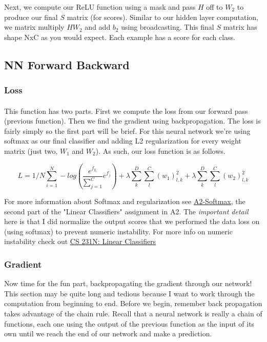 \documentclass[12pt]{article}
\begin{document}
Next, we compute our ReLU function using a mask and pass $H$ off to $W_2$ to produce 
our final $S$ matrix (for scores). Similar to our hidden layer computation, we matrix multiply
$HW_2$ and add $b_2$ using broadcasting. This final $S$ matrix has shape NxC as you would 
expect. Each example has a score for each class. 

\subsection{NN Forward Backward}
\subsubsection*{Loss}
\paragraph{}
This function has two parts. First we compute the loss from our forward pass (previous function). 
Then we find the gradient using backpropagation. The loss is fairly simply so the first
part will be brief. For this neural network we're using softmax as our final classifier and adding 
L2 regularization for every weight matrix (just two, $W_1$ and $W_2$). As such, our loss 
function is as follows. 

\begin{equation}
    L = 1/N \sum_{i=1}^N - log(\frac{e^{f_{y_i}}}{\sum_{j=1}^C} e^{f_j}) + 
    \lambda \sum_{k}^D \sum_{l}^C (w_1)_{l, k}^2 + 
    \lambda \sum_{k}^D \sum_{l}^C (w_2)_{l, k}^2
\end{equation}

\noindent For more information about Softmax and regularization see 
\href{https://github.com/bensmidt/EECS-498-DL-Computer-Vision/blob/main/A2/A2-Softmax.pdf}
{A2-Softmax}, the second part of the "Linear Classifiers" assignment in A2. The \emph{
important detail} here is that I did normalize the output scores that we performed the 
data loss on (using softmax) to prevent numeric instability. For more info on numeric instability
check out \href{https://cs231n.github.io/linear-classify/}{CS 231N: Linear Classifiers}

\subsubsection*{Gradient}

Now time for the fun part, backpropagating the gradient through our network! This section may 
be quite long and tedious because I want to work through the computation from beginning to end.
Before we begin, remember back propagation takes advantage of the chain rule. Recall that a neural 
network is really a chain of functions, each one using the output of the previous function as 
the input of its own until we reach the end of our network and make a prediction. 
\end{document}
